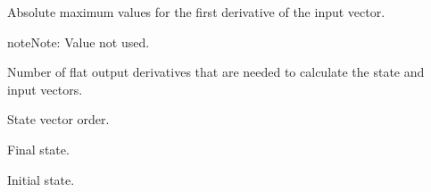 \documentclass[letterpaper,10pt,english]{sphinxmanual}
\begin{document}
\begin{fulllineitems}

\begin{fulllineitems}
\label{Multi-robot motion planner:planning_sim.UnicycleKineModel.acc_max}
Absolute maximum values for the first derivative of the input vector.

\begin{notice}{note}{Note:}
Value not used.
\end{notice}

\end{fulllineitems}


\begin{fulllineitems}
\label{Multi-robot motion planner:planning_sim.UnicycleKineModel.l}
Number of flat output derivatives that are needed to calculate the state
and input vectors.

\end{fulllineitems}


\begin{fulllineitems}
\label{Multi-robot motion planner:planning_sim.UnicycleKineModel.q_dim}
State vector order.

\end{fulllineitems}


\begin{fulllineitems}
\label{Multi-robot motion planner:planning_sim.UnicycleKineModel.q_final}
Final state.

\end{fulllineitems}


\begin{fulllineitems}
\label{Multi-robot motion planner:planning_sim.UnicycleKineModel.q_init}
Initial state.

\end{fulllineitems}



\end{fulllineitems}
\end{document}
